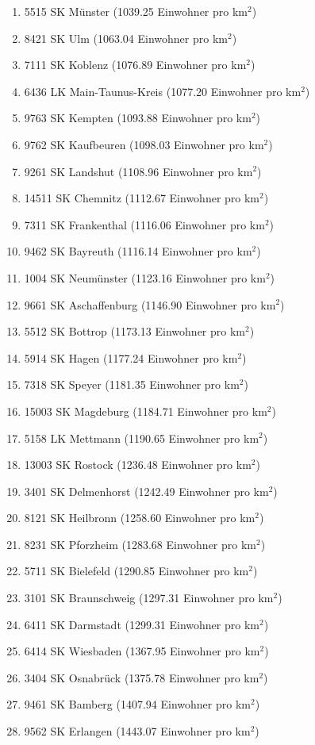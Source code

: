 \begin{enumerate}[itemsep=-6mm]
\item 5515 SK Münster (1039.25 Einwohner pro km$^2$)
\item 8421 SK Ulm (1063.04 Einwohner pro km$^2$)
\item 7111 SK Koblenz (1076.89 Einwohner pro km$^2$)
\item 6436 LK Main-Taunus-Kreis (1077.20 Einwohner pro km$^2$)
\item 9763 SK Kempten (1093.88 Einwohner pro km$^2$)
\item 9762 SK Kaufbeuren (1098.03 Einwohner pro km$^2$)
\item 9261 SK Landshut (1108.96 Einwohner pro km$^2$)
\item 14511 SK Chemnitz (1112.67 Einwohner pro km$^2$)
\item 7311 SK Frankenthal (1116.06 Einwohner pro km$^2$)
\item 9462 SK Bayreuth (1116.14 Einwohner pro km$^2$)
\item 1004 SK Neumünster (1123.16 Einwohner pro km$^2$)
\item 9661 SK Aschaffenburg (1146.90 Einwohner pro km$^2$)
\item 5512 SK Bottrop (1173.13 Einwohner pro km$^2$)
\item 5914 SK Hagen (1177.24 Einwohner pro km$^2$)
\item 7318 SK Speyer (1181.35 Einwohner pro km$^2$)
\item 15003 SK Magdeburg (1184.71 Einwohner pro km$^2$)
\item 5158 LK Mettmann (1190.65 Einwohner pro km$^2$)
\item 13003 SK Rostock (1236.48 Einwohner pro km$^2$)
\item 3401 SK Delmenhorst (1242.49 Einwohner pro km$^2$)
\item 8121 SK Heilbronn (1258.60 Einwohner pro km$^2$)
\item 8231 SK Pforzheim (1283.68 Einwohner pro km$^2$)
\item 5711 SK Bielefeld (1290.85 Einwohner pro km$^2$)
\item 3101 SK Braunschweig (1297.31 Einwohner pro km$^2$)
\item 6411 SK Darmstadt (1299.31 Einwohner pro km$^2$)
\item 6414 SK Wiesbaden (1367.95 Einwohner pro km$^2$)
\item 3404 SK Osnabrück (1375.78 Einwohner pro km$^2$)
\item 9461 SK Bamberg (1407.94 Einwohner pro km$^2$)
\item 9562 SK Erlangen (1443.07 Einwohner pro km$^2$)

\end{enumerate}
